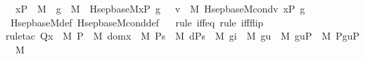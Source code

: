 \begin{isabellebody}
\ \ {\isachardoublequoteopen}xP\ {\isasymin}\ M\ {\isasymLongrightarrow}\ g\ {\isasymin}\ M\ {\isasymLongrightarrow}\ Hsep{\isacharunderscore}{\kern0pt}base{\isacharunderscore}{\kern0pt}M{\isacharparenleft}{\kern0pt}xP{\isacharcomma}{\kern0pt}\ g{\isacharparenright}{\kern0pt}\ {\isacharequal}{\kern0pt}\ {\isacharbraceleft}{\kern0pt}\ v\ {\isasymin}\ M{\isachardot}{\kern0pt}\ Hsep{\isacharunderscore}{\kern0pt}base{\isacharunderscore}{\kern0pt}M{\isacharunderscore}{\kern0pt}cond{\isacharparenleft}{\kern0pt}v{\isacharcomma}{\kern0pt}\ xP{\isacharcomma}{\kern0pt}\ g{\isacharparenright}{\kern0pt}\ {\isacharbraceright}{\kern0pt}{\isachardoublequoteclose}\ \isanewline
%
\isadelimproof
\ \ %
\endisadelimproof
%
\isatagproof
{}\isamarkupfalse%
\ Hsep{\isacharunderscore}{\kern0pt}base{\isacharunderscore}{\kern0pt}M{\isacharunderscore}{\kern0pt}def\ Hsep{\isacharunderscore}{\kern0pt}base{\isacharunderscore}{\kern0pt}M{\isacharunderscore}{\kern0pt}cond{\isacharunderscore}{\kern0pt}def\isanewline
\ \ \isamarkupfalse%
{\isacharparenleft}{\kern0pt}rule\ iff{\isacharunderscore}{\kern0pt}eq{\isacharcomma}{\kern0pt}\ rule\ iff{\isacharunderscore}{\kern0pt}flip{\isacharparenright}{\kern0pt}\ \isanewline
\ \ \isamarkupfalse%
{\isacharparenleft}{\kern0pt}rule{\isacharunderscore}{\kern0pt}tac\ Q{\isacharequal}{\kern0pt}{\isachardoublequoteopen}{\isasymexists}x\ {\isasymin}\ M{\isachardot}{\kern0pt}\ {\isasymexists}P\ {\isasymin}\ M{\isachardot}{\kern0pt}\ {\isasymexists}domx\ {\isasymin}\ M{\isachardot}{\kern0pt}\ {\isasymexists}Ps\ {\isasymin}\ M{\isachardot}{\kern0pt}\ {\isasymexists}dPs\ {\isasymin}\ M{\isachardot}{\kern0pt}\ {\isasymexists}gi\ {\isasymin}\ M{\isachardot}{\kern0pt}\ {\isasymexists}gu\ {\isasymin}\ M{\isachardot}{\kern0pt}\ {\isasymexists}guP\ {\isasymin}\ M{\isachardot}{\kern0pt}\ {\isasymexists}PguP\ {\isasymin}\ M{\isachardot}{\kern0pt}\ \isanewline

\end{isabellebody}
